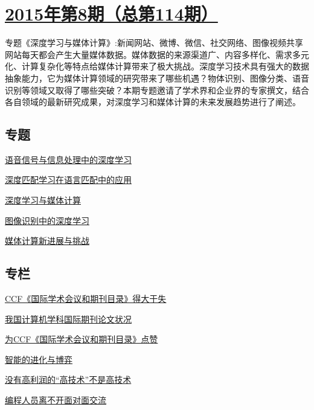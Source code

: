\documentclass[a4paper]{article}
\begin{document}
\section{\href{http://history.ccf.org.cn/sites/ccf/jsjtbbd.jsp?contentId=2878259748700}{\textbf{2015年第8期（总第114期）}}}
专题《深度学习与媒体计算》:新闻网站、微博、微信、社交网络、图像视频共享网站每天都会产生大量媒体数据。媒体数据的来源渠道广、内容多样化、需求多元化、计算复杂化等特点给媒体计算带来了极大挑战。深度学习技术具有强大的数据抽象能力，它为媒体计算领域的研究带来了哪些机遇？物体识别、图像分类、语音识别等领域又取得了哪些突破？本期专题邀请了学术界和企业界的专家撰文，结合各自领域的最新研究成果，对深度学习和媒体计算的未来发展趋势进行了阐述。
\subsection{专题}
\href{http://history.ccf.org.cn/resources/1190201776262/2015/08/12/4.pdf}{语音信号与信息处理中的深度学习}

\href{http://history.ccf.org.cn/resources/1190201776262/2015/08/12/5.pdf}{深度匹配学习在语言匹配中的应用}

\href{http://history.ccf.org.cn/resources/1190201776262/2015/08/11/1.pdf}{深度学习与媒体计算}

\href{http://history.ccf.org.cn/resources/1190201776262/2015/08/12/3.pdf}{图像识别中的深度学习}

\href{http://history.ccf.org.cn/resources/1190201776262/2015/08/11/2.pdf}{媒体计算新进展与挑战}

\subsection{专栏}
\href{http://history.ccf.org.cn/resources/1190201776262/2015/08/12/6.pdf}{CCF《国际学术会议和期刊目录》得大于失}

\href{http://history.ccf.org.cn/resources/1190201776262/2015/08/12/7.pdf}{我国计算机学科国际期刊论文状况}

\href{http://history.ccf.org.cn/resources/1190201776262/2015/08/12/8.pdf}{为CCF《国际学术会议和期刊目录》点赞}

\href{http://history.ccf.org.cn/resources/1190201776262/2015/08/12/9.pdf}{智能的进化与博弈}

\href{http://history.ccf.org.cn/resources/1190201776262/2015/08/12/10.pdf}{没有高利润的“高技术”不是高技术}

\href{http://history.ccf.org.cn/resources/1190201776262/2015/08/12/11.pdf}{编程人员离不开面对面交流}
\end{document}
